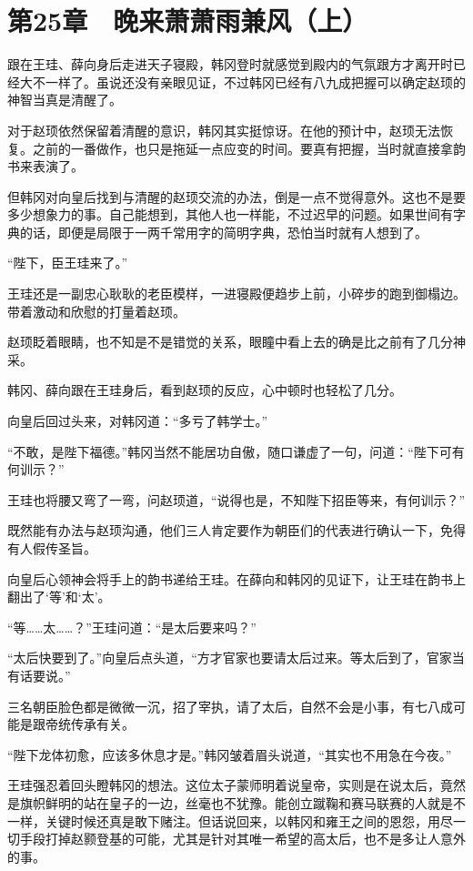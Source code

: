 \section{第25章　晚来萧萧雨兼风（上）}

跟在王珪、薛向身后走进天子寝殿，韩冈登时就感觉到殿内的气氛跟方才离开时已经大不一样了。虽说还没有亲眼见证，不过韩冈已经有八九成把握可以确定赵顼的神智当真是清醒了。

对于赵顼依然保留着清醒的意识，韩冈其实挺惊讶。在他的预计中，赵顼无法恢复。之前的一番做作，也只是拖延一点应变的时间。要真有把握，当时就直接拿韵书来表演了。

但韩冈对向皇后找到与清醒的赵顼交流的办法，倒是一点不觉得意外。这也不是要多少想象力的事。自己能想到，其他人也一样能，不过迟早的问题。如果世间有字典的话，即便是局限于一两千常用字的简明字典，恐怕当时就有人想到了。

“陛下，臣王珪来了。”

王珪还是一副忠心耿耿的老臣模样，一进寝殿便趋步上前，小碎步的跑到御榻边。带着激动和欣慰的打量着赵顼。

赵顼眨着眼睛，也不知是不是错觉的关系，眼瞳中看上去的确是比之前有了几分神采。

韩冈、薛向跟在王珪身后，看到赵顼的反应，心中顿时也轻松了几分。

向皇后回过头来，对韩冈道：“多亏了韩学士。”

“不敢，是陛下福德。”韩冈当然不能居功自傲，随口谦虚了一句，问道：“陛下可有何训示？”

王珪也将腰又弯了一弯，问赵顼道，“说得也是，不知陛下招臣等来，有何训示？”

既然能有办法与赵顼沟通，他们三人肯定要作为朝臣们的代表进行确认一下，免得有人假传圣旨。

向皇后心领神会将手上的韵书递给王珪。在薛向和韩冈的见证下，让王珪在韵书上翻出了‘等’和‘太’。

“等……太……？”王珪问道：“是太后要来吗？”

“太后快要到了。”向皇后点头道，“方才官家也要请太后过来。等太后到了，官家当有话要说。”

三名朝臣脸色都是微微一沉，招了宰执，请了太后，自然不会是小事，有七八成可能是跟帝统传承有关。

“陛下龙体初愈，应该多休息才是。”韩冈皱着眉头说道，“其实也不用急在今夜。”

王珪强忍着回头瞪韩冈的想法。这位太子蒙师明着说皇帝，实则是在说太后，竟然是旗帜鲜明的站在皇子的一边，丝毫也不犹豫。能创立蹴鞠和赛马联赛的人就是不一样，关键时候还真是敢下赌注。但话说回来，以韩冈和雍王之间的恩怨，用尽一切手段打掉赵颢登基的可能，尤其是针对其唯一希望的高太后，也不是多让人意外的事。

